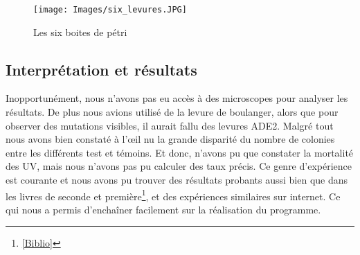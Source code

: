     \begin{figure}[H]
			\begin{center}
				\texttt{[image: Images/six\_levures.JPG]}
			\end{center}
			\caption{Les six boites de pétri}
		\end{figure}
  
\subsection{Interprétation et résultats}
  Inopportunément, nous n'avons pas eu accès à des microscopes pour analyser les résultats. De plus nous avions utilisé de la levure de boulanger, alors que pour observer des mutations visibles, il aurait fallu des levures ADE2. Malgré tout nous avons bien constaté à l'œil nu la grande disparité du nombre de colonies entre les différents test et témoins. Et donc, n'avons pu que constater la mortalité des UV, mais nous n'avons pas pu calculer des taux précis.
  Ce genre d'expérience est courante et nous avons pu trouver des résultats probants aussi bien que dans les livres de seconde et première\footnote{\ref{Biblio}}, et des expériences similaires sur internet. Ce qui nous a permis d'enchaîner facilement sur la réalisation du programme.
  
  
